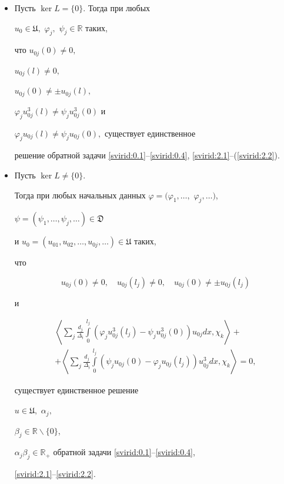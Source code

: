 \begin{theorem}[2.1]

\begin{itemize}

  \item [\rm (i)] Пусть $\ker L=\{0\}.$ Тогда при любых

$u_{0}\in\mathfrak{U},$ $\varphi_j,$ $\psi_j\in\mathbb{R}$ таких{\rm ,}

что $u_{0j}(0)\neq 0,$

$u_{0j}(l)\neq 0,$

$u_{0j}(0)\neq \pm u_{0j}(l),$

$\varphi_ju_{0j}^3(l)\neq\psi_ju_{0j}^3(0)$ и

$\varphi_ju_{0j}(l)\neq\psi_ju_{0j}(0),$  существует единственное

решение обратной задачи \eqref{svirid:0.1}--\eqref{svirid:0.4}, \eqref{svirid:2.1}--(\ref{svirid:2.2}).

    \item [\rm(ii)] Пусть $\ker L\neq\{0\}.$

    Тогда при любых начальных данных $\varphi=(\varphi_1, \dots,$ $\varphi_j, \dots)$,

$\psi=(\psi_1, \dots, \psi_j, \dots)\in\mathfrak{D}$

и $u_{0}=(u_{01}, u_{02}, \dots, u_{0j}, \dots)\in\mathfrak{U}$ таких{\rm,}

    что

    \begin{equation}\label{svirid:2.12}

    u_{0j}(0)\neq 0,\quad u_{0j}(l_j)\neq 0,\quad u_{0j}(0)\neq \pm u_{0j}(l_j)

    \end{equation}

    и

\begin{multline}\label{svirid:2.13}

      \left\langle\sum\limits_j\frac{d_j}{\mathfrak{\Delta_j}}\int\limits_0^{l_j}(\varphi_j u_{0j}^3(l_j)-\psi_j u_{0j}^3(0))u_{0j}dx,

    \chi_k\right\rangle+ \\

+\left\langle\sum\limits_j\frac{d_j}{\mathfrak{\Delta_j}}\int\limits_0^{l_j}

(\psi_j u_{0j}(0)-\varphi_j u_{0j}(l_j))u_{0j}^3dx,

\chi_k\right\rangle=0,

\end{multline}

существует единственное решение

$u\in\mathfrak{U},$  $\alpha_j,$

$\beta_j\in\mathbb{R}\backslash\{0\}$,

$\alpha_j\beta_j\in\mathbb{R}_+$ обратной задачи \eqref{svirid:0.1}--\eqref{svirid:0.4},

\eqref{svirid:2.1}--\eqref{svirid:2.2}.

\end{itemize}

\end{theorem}



